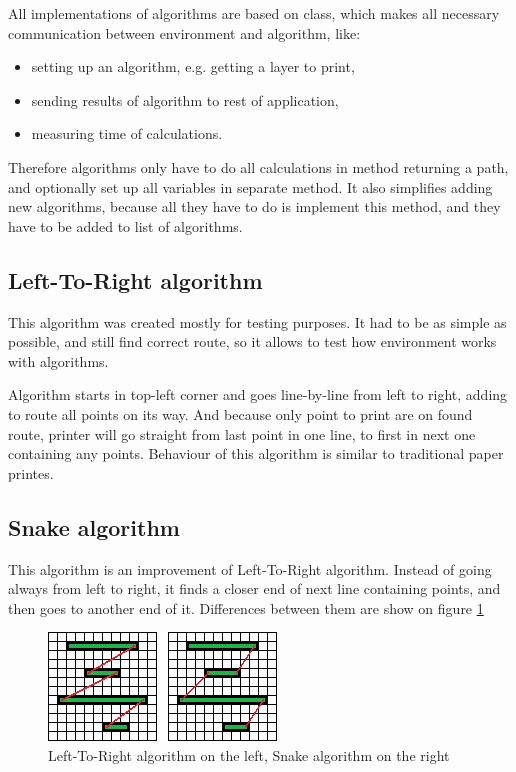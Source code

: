 \documentclass[]{article}
\begin{document}
All implementations of algorithms are based on class, which makes all necessary communication between environment and algorithm, like:
\begin{itemize}
\item setting up an algorithm, e.g. getting a layer to print,
\item sending results of algorithm to rest of application,
\item measuring time of calculations.
\end{itemize}
Therefore algorithms only have to do all calculations in method returning a path, and optionally set up all variables in separate method. It also simplifies adding new algorithms, because all they have to do is implement this method, and they have to be added to list of algorithms.

\subsection{Left-To-Right algorithm}
This algorithm was created mostly for testing purposes. It had to be as simple as possible, and still find correct route, so it allows to test how environment works with algorithms.

Algorithm starts in top-left corner and goes line-by-line from left to right, adding to route all points on its way. And because only point to print are on found route, printer will go straight from last point in one line, to first in next one containing any points. Behaviour of this algorithm is similar to traditional paper printes.

\subsection{Snake algorithm}
This algorithm is an improvement of Left-To-Right algorithm. Instead of going always from left to right, it finds a closer end of next line containing points, and then goes to another end of it. Differences between them are show on figure \ref{img:ltr-vs-snake}

\begin{figure}
\begin{center}
\includegraphics[scale=2]{img/ltr-vs-snake}
\caption{Left-To-Right algorithm on the left, Snake algorithm on the right}
\label{img:ltr-vs-snake}
\end{center}
\end{figure}
\end{document}
